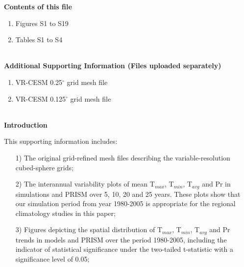 \documentclass[ms]{agutexSI}
\begin{document}
\begin{article}

%
%



\noindent\textbf{Contents of this file}
\begin{enumerate}
\item Figures S1 to S19
\item Tables S1 to S4
\end{enumerate}
\ \\

\noindent\textbf{Additional Supporting Information (Files uploaded separately)}
\begin{enumerate}
\item VR-CESM 0.25$^\circ$ grid mesh file
\item VR-CESM 0.125$^\circ$ grid mesh file
\end{enumerate}
\ \\

\noindent\textbf{Introduction}

This supporting information includes:

\begin{itemize}
\item[1)] The original grid-refined mesh files describing the variable-resolution cubed-sphere grids;

\item[2)] The interannual variability plots of mean T$_{max}$, T$_{min}$, T$_{avg}$ and Pr in simulations and PRISM over 5, 10, 20 and 25 years.  These plots show that our simulation period from year 1980-2005 is appropriate for the regional climatology studies in this paper;

\item[3)] Figures depicting the spatial distribution of T$_{max}$, T$_{min}$, T$_{avg}$ and Pr trends in models and PRISM over the period 1980-2005, including the indicator of statistical significance under the two-tailed t-statistic with a significance level of 0.05;


\end{itemize}
\end{article}
\end{document}
